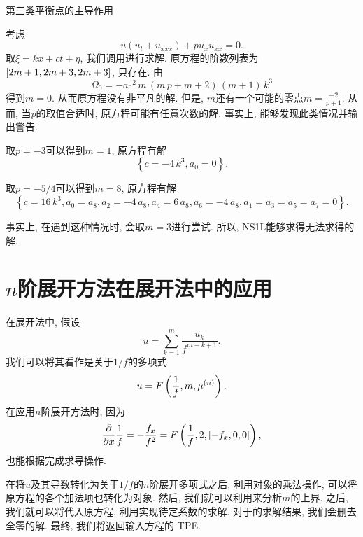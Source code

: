 \begin{example} 第三类平衡点的主导作用 

考虑
\begin{equation}
    u(u_t+u_{xxx})+pu_x u_{xx}=0.
\end{equation}
取$\xi=kx+ct+\eta$, 我们调用进行求解. 原方程的阶数列表为$\left[2m+1,2m+3,2m+3\right]$, 只存在\BPthree{}. 由
\begin{equation}
    \Omega_0=-{{{a}_{0}}}^{2}\,m\,\left( m\,p+m+2\right) \,\left( m+1\right) \,{k}^{3}
\end{equation}
得到$m=0$. 从而原方程没有非平凡的解. 但是, $m$还有一个可能的零点$m=\frac{-2}{p+1}$. 从而, 当$p$的取值合适时, 原方程可能有任意次数的解. 事实上, 能够发现此类情况并输出警告. 

取$p=-3$可以得到$m=1$, 原方程有解 
\begin{equation}
    \left\{ c=-4\,{k}^{3},{{a}_{0}}=0\right\} .
\end{equation}

取$p=-5/4$可以得到$m=8$, 原方程有解 
\begin{equation}
    \left\{ c=16\,{k}^{3},{{a}_{0}}={{a}_{8}},{{a}_{2}}=-4\,{{a}_{8}},{{a}_{4}}=6\,{{a}_{8}},{{a}_{6}}=-4\,{{a}_{8}},a_1=a_3=a_5=a_7=0\right\} .
\end{equation}

事实上, 在遇到这种情况时, 会取$m=3$进行尝试. 所以, NS1L能够求得无法求得的解. 
\end{example}

\section{$n$阶展开方法在\Painleve{}展开法中的应用}\label{ch4sec6}
在\Painleve{}展开法中, 假设 
\begin{equation}
    u=\sum_{k=1}^{m}\frac{u_k}{f^{m-k+1}}. \label{TPE-pkg}
\end{equation}
我们可以将其看作是关于$1/f$的多项式
\begin{equation}
    u=F\left(\frac{1}{f},m,\mu^{(n)}\right).
\end{equation}
在应用$n$阶展开方法时, 因为 
\begin{equation}
    \frac{\partial}{\partial x}{\frac{1}{f}}=-\frac{f_x}{f^2}=F\left(\frac{1}{f},2,\left[-f_x,0,0\right]\right),
\end{equation}
也能根据完成求导操作. 

在将$u$及其导数转化为关于$1/f$的$n$阶展开多项式之后, 利用对象的乘法操作, 可以将原方程的各个加法项也转化为对象. 然后, 我们就可以利用来分析$m$的上界. 之后, 我们就可以将代入原方程, 利用实现待定系数的求解. 对于的求解结果, 我们会删去全零的解. 最终, 我们将返回输入方程的 TPE. 

